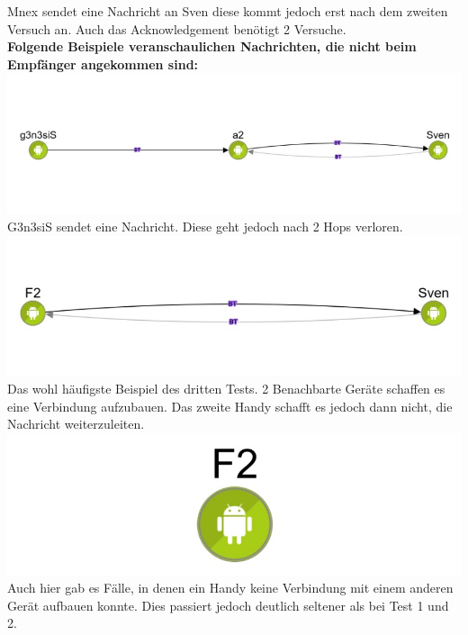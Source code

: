 Mnex sendet eine Nachricht an Sven diese kommt jedoch erst nach dem
zweiten Versuch an. Auch das Acknowledgement benötigt 2 Versuche.
\\
\textbf{Folgende Beispiele veranschaulichen Nachrichten, die nicht beim
Empfänger angekommen sind:}\\

\includegraphics[width=1.0\textwidth]{belege/grosstests/Bilder/Grosstest2/Test3Misserfolg1.jpg}\\
G3n3siS sendet eine Nachricht. Diese geht jedoch nach 2 Hops verloren.\\

\includegraphics[width=1.0\textwidth]{belege/grosstests/Bilder/Grosstest2/Test3Misserfolg2.jpg}\\
Das wohl häufigste Beispiel des dritten Tests. 2 Benachbarte Geräte
schaffen es eine Verbindung aufzubauen. Das zweite Handy schafft es
jedoch dann nicht, die Nachricht weiterzuleiten.\\


\includegraphics[width=1.0\textwidth]{belege/grosstests/Bilder/Grosstest2/Test3Misserfolg3.jpg}\\
Auch hier gab es Fälle, in denen ein Handy keine Verbindung mit einem anderen Gerät aufbauen konnte. Dies passiert jedoch deutlich seltener als bei Test 1 und 2. 
